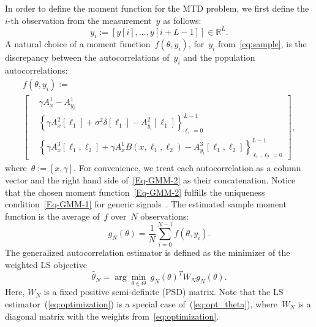 \documentclass{article}
\newcommand{\R}[0]{\mathbb{R}}
\begin{document}
In order to define the moment function for the MTD problem, we first define the $i$-th observation from the measurement~$y$ as follows:
\begin{equation}\label{eq:sample}
	y_i := [y[i],\ldots, y[i+L-1]]\in\R^L.
\end{equation}
A natural choice {of a} moment function~$f(\theta, y_i)$, for~$y_i$ from~\eqref{eq:sample}, {is the discrepancy between the autocorrelations of~$y_i$ and the population autocorrelations}:
\begin{multline} \label{Eq-GMM-2}
	f(\theta, y_i) := \\
	\begin{bmatrix}
		&\gamma A_x^1 - A_{y_i}^1\\
		&\left\{\gamma A_x^2[\ell_1] + \sigma^2 \delta[\ell_1] - A_{y_i}^2 [\ell_1]\right\}_{\ell_1 = 0}^{L-1} \\
		&\left\{\gamma A_x^3[\ell_1, \ell_2] + \gamma A_{x}^1 B(x, \ell_1, \ell_2) - A_{y_i}^3[\ell_1, \ell_2]\right\}_{\ell_1, \ell_2 = 0}^{L-1}
	\end{bmatrix},
\end{multline}
where~\mbox{$\theta := [x, \gamma]$}. For convenience, we treat each autocorrelation as a column vector
and the right hand side of~\eqref{Eq-GMM-2} as their concatenation.
Notice that the chosen moment function~\eqref{Eq-GMM-2} fulfills the {uniqueness} condition~\eqref{Eq-GMM-1} for generic signals~\cite{bendory2019multi}. The estimated sample moment function is the average of~$f$ over~$N$ observations:
\begin{equation}\label{Eq-2-5}
	g_N(\theta) = \frac{1}{N} \sum_{i = 0}^{N - 1} f(\theta, y_i).
\end{equation}
The generalized autocorrelation estimator is defined as the minimizer of the weighted LS objective
\begin{equation} \label{eq:opt_theta}
	\hat{\theta}_N = \arg\min_{\theta \in \Theta} \ g_N(\theta)^T W_N g_N(\theta).
\end{equation}
Here, $W_N$ is a fixed positive semi-definite (PSD) matrix. Note that the LS estimator~(\ref{eq:optimization}) is a special case of~(\ref{eq:opt_theta}), where~$W_N$ is a diagonal matrix with the weights from~\eqref{eq:optimization}.
\end{document}
